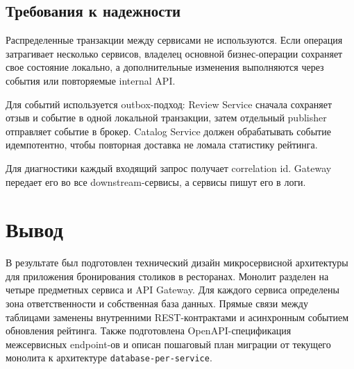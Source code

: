 \documentclass[14pt,a4paper]{extarticle}
\newcommand{\code}[1]{\texttt{#1}}
\begin{document}
\subsection{Требования к надежности}

Распределенные транзакции между сервисами не используются. Если операция затрагивает несколько сервисов, владелец основной бизнес-операции сохраняет свое состояние локально, а дополнительные изменения выполняются через события или повторяемые internal API.

Для событий используется outbox-подход: Review Service сначала сохраняет отзыв и событие в одной локальной транзакции, затем отдельный publisher отправляет событие в брокер. Catalog Service должен обрабатывать событие идемпотентно, чтобы повторная доставка не ломала статистику рейтинга.

Для диагностики каждый входящий запрос получает correlation id. Gateway передает его во все downstream-сервисы, а сервисы пишут его в логи.

\section{Вывод}

В результате был подготовлен технический дизайн микросервисной архитектуры для приложения бронирования столиков в ресторанах. Монолит разделен на четыре предметных сервиса и API Gateway. Для каждого сервиса определены зона ответственности и собственная база данных. Прямые связи между таблицами заменены внутренними REST-контрактами и асинхронным событием обновления рейтинга. Также подготовлена OpenAPI-спецификация межсервисных endpoint-ов и описан пошаговый план миграции от текущего монолита к архитектуре \code{database-per-service}.
\end{document}

